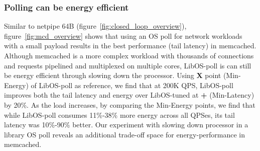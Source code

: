 
\subsubsection{Polling can be energy efficient}
\label{sec:mcd:poll}
Similar to netpipe 64B (figure~\ref{fig:closed_loop_overview}), figure~\ref{fig:mcd_overview} shows that using an OS poll for network workloads with a small payload results in the best performance (tail latency) in memcached. Although memcached is a more complex workload with thousands of connections and requests pipelined and multiplexed on multiple cores, LibOS-poll is can still be energy efficient through slowing down the processor. Using \textbf{X} point (Min-Energy) of LibOS-poll as reference, we find that at 200K QPS, LibOS-poll improves both the tail latency and energy over LibOS-tuned at \textbf{+} (Min-Latency) by 20\%. As the load increases, by comparing the Min-Energy points, we find that while LibOS-poll consumes 11\%-38\% more energy across all QPSes, its tail latency was 10\%-90\% better. Our experiment with slowing down processor in a library OS poll reveals an additional trade-off space for energy-performance in memcached.


